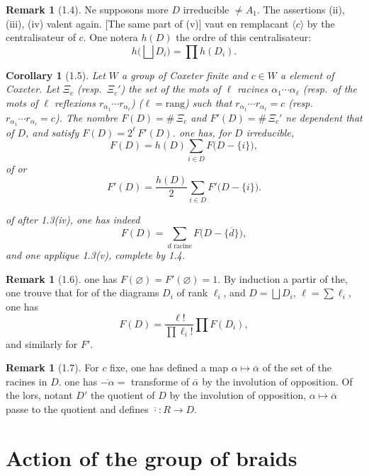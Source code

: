 \documentclass[11pt,a4paper]{article}
\theoremstyle{plain}
\newtheorem{corollary}[theorem]{Corollary}
\theoremstyle{definition}
\newtheorem{remark}[theorem]{Remark}
\begin{document}
\newpage

\begin{remark}[1.4]
Ne supposons more $D$ irreducible $\neq A_1$. The assertions (ii), (iii), (iv) valent again. [The same part of (v)] vaut en remplacant $\langle c \rangle$ by the centralisateur of $c$. One notera $h(D)$ the ordre of this centralisateur:
\[
h\bigl(\textstyle\bigsqcup D_i\bigr) = \prod h(D_i).
\]
\end{remark}

\begin{corollary}[1.5]
Let $W$ a group of Coxeter finite and $c \in W$ a element of Coxeter. Let $\Xi_c$ (resp.\ $\Xi_c'$) the set of the mots of $\ell$ racines $\alpha_1 \cdots \alpha_\ell$ (resp.\ of the mots of $\ell$ reflexions $r_{\alpha_1} \cdots r_{\alpha_\ell}$) ($\ell = \text{rang}$) such that $r_{\alpha_1} \cdots r_{\alpha_\ell} = c$ (resp.\ $r_{\alpha_1} \cdots r_{\alpha_\ell} = c$). The nombre $F(D) = \#\,\Xi_c$ and $F'(D) = \#\,\Xi_c'$ ne dependent that of $D$, and satisfy $F(D) = 2^\ell\, F'(D)$. one has, for $D$ irreducible,
\[
F(D) = h(D) \sum_{i \in D} F\bigl(D - \{i\}\bigr),
\]
of or
\[
F'(D) = \frac{h(D)}{2} \sum_{i \in D} F'\bigl(D - \{i\}\bigr).
\]

of after 1.3(iv), one has indeed
\[
F(D) = \sum_{d \text{ racine}} F\bigl(D - \{\overline{d}\}\bigr),
\]
and one applique 1.3(v), complete by 1.4.
\end{corollary}

\begin{remark}[1.6]
one has $F(\varnothing) = F'(\varnothing) = 1$. By induction a partir of the, one trouve that for of the diagrams $D_i$ of rank $\ell_i$, and $D = \bigsqcup D_i$, $\ell = \sum \ell_i$, one has
\[
F(D) = \frac{\ell!}{\prod \ell_i!} \prod F(D_i),
\]
and similarly for $F'$.
\end{remark}

\begin{remark}[1.7]
For $c$ fixe, one has defined a map $\alpha \mapsto \overline{\alpha}$ of the set of the racines in $D$. one has $\overline{-\alpha} =$ transforme of $\overline{\alpha}$ by the involution of opposition. Of the lors, notant $D'$ the quotient of $D$ by the involution of opposition, $\alpha \mapsto \overline{\alpha}$ passe to the quotient and defines $\overline{\cdot} : R \to D$.
\end{remark}

\newpage

\section{Action of the group of braids}
\end{document}
